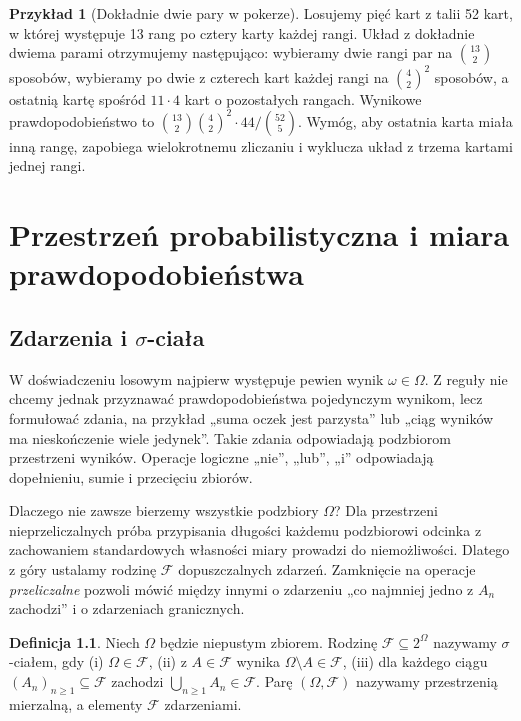 \documentclass[11pt,a4paper,oneside]{report}
\numberwithin{equation}{chapter}
\theoremstyle{plain}
\theoremstyle{definition}
\newtheorem{definicja}{Definicja}[chapter]
\newtheorem{przyklad}{Przykład}[chapter]
\theoremstyle{remark}
\begin{document}
\begin{przyklad}[Dokładnie dwie pary w pokerze]
Losujemy pięć kart z talii 52 kart, w której występuje 13 rang
po cztery karty każdej rangi. Układ z dokładnie dwiema parami
otrzymujemy następująco: wybieramy dwie rangi par na $\binom{13}2$
sposobów, wybieramy po dwie z czterech kart każdej rangi
na $\binom42^2$ sposobów, a ostatnią kartę spośród
$11\cdot4$ kart o pozostałych rangach. Wynikowe
prawdopodobieństwo to
$\binom{13}2\binom42^2\cdot44/\binom{52}5$.
Wymóg, aby ostatnia karta miała inną rangę, zapobiega
wielokrotnemu zliczaniu i wyklucza układ z trzema
kartami jednej rangi.
\end{przyklad}

\chapter{Przestrzeń probabilistyczna i miara prawdopodobieństwa}

\section{Zdarzenia i \texorpdfstring{$\sigma$}{sigma}-ciała}
W doświadczeniu losowym najpierw występuje pewien wynik
$\omega\in\Omega$. Z reguły nie chcemy jednak przyznawać
prawdopodobieństwa pojedynczym wynikom, lecz formułować zdania,
na przykład „suma oczek jest parzysta” lub „ciąg wyników ma
nieskończenie wiele jedynek”. Takie zdania odpowiadają podzbiorom
przestrzeni wyników. Operacje logiczne „nie”, „lub”, „i” odpowiadają
dopełnieniu, sumie i przecięciu zbiorów.

Dlaczego nie zawsze bierzemy wszystkie podzbiory $\Omega$?
Dla przestrzeni nieprzeliczalnych próba przypisania długości
każdemu podzbiorowi odcinka z zachowaniem standardowych
własności miary prowadzi do niemożliwości. Dlatego z góry
ustalamy rodzinę $\mathcal F$ dopuszczalnych zdarzeń.
Zamknięcie na operacje \emph{przeliczalne} pozwoli mówić
między innymi o zdarzeniu „co najmniej jedno z $A_n$ zachodzi”
i o zdarzeniach granicznych.

\begin{definicja}
Niech $\Omega$ będzie niepustym zbiorem. Rodzinę $\mathcal F\subseteq2^\Omega$
nazywamy $\sigma$-ciałem, gdy (i) $\Omega\in\mathcal F$,
(ii) z $A\in\mathcal F$ wynika $\Omega\setminus A\in\mathcal F$,
(iii) dla każdego ciągu $(A_n)_{n\geq1}\subseteq\mathcal F$ zachodzi
$\bigcup_{n\geq1}A_n\in\mathcal F$.
Parę $(\Omega,\mathcal F)$ nazywamy przestrzenią mierzalną,
a elementy $\mathcal F$ zdarzeniami.
\end{definicja}
\end{document}
